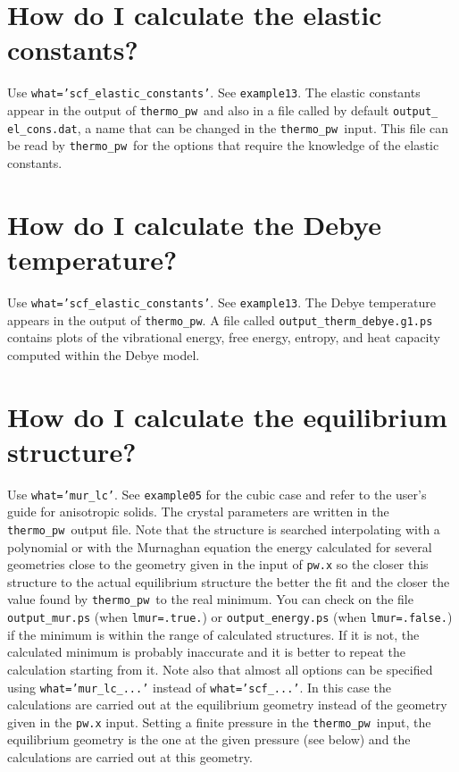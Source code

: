 \documentclass[12pt,a4paper]{article}
\def\thermo{\texttt{thermo\_pw}}
\begin{document}
\newpage
\section{\color{coral}How do I calculate the elastic constants?}
Use \texttt{what='scf\_elastic\_constants'}. See \texttt{example13}. The
elastic constants appear in the output of \thermo\ and also in a file
called by default \texttt{output\_} \texttt{el\_cons.dat}, a name 
that can be changed in the \thermo\ input. This file can be read 
by \thermo\ for the options
that require the knowledge of the elastic constants.

\newpage
\section{\color{coral}How do I calculate the Debye temperature?}
Use \texttt{what='scf\_elastic\_constants'}. See \texttt{example13}. The
Debye temperature appears in the output of \thermo. A file called
\texttt{output\_therm\_debye.g1.ps} contains plots of the vibrational
energy, free energy, entropy, and heat capacity computed within the 
Debye model.

\newpage
\section{\color{coral}How do I calculate the equilibrium structure?}
Use \texttt{what='mur\_lc'}. See \texttt{example05} for the cubic case
and refer to the user's
guide for anisotropic solids. The crystal
parameters are written in the \thermo\ output file. Note that the structure is
searched interpolating with a polynomial or with the Murnaghan
equation the energy calculated for several geometries close to the geometry 
given in the input of \texttt{pw.x} so the closer this structure to the 
actual equilibrium structure the better the fit and the
closer the value found by \thermo\ to the real minimum. 
You can check on the file
\texttt{output\_mur.ps} (when \texttt{lmur=.true.}) or 
\texttt{output\_energy.ps} (when \texttt{lmur=.false.}) if the minimum
is within the range of calculated structures. If it is not, 
the calculated minimum is probably inaccurate and it is better to repeat the 
calculation starting from it.
Note also that almost all options can be specified using
\texttt{what='mur\_lc\_...'} instead of \texttt{what='scf\_...'}.
In this case the calculations are carried out at the equilibrium geometry 
instead of the geometry given in the \texttt{pw.x} input. 
Setting a finite pressure in the \thermo\ input, 
the equilibrium geometry is the one at the given pressure (see below)
and the calculations are carried out at this geometry.
\end{document}
